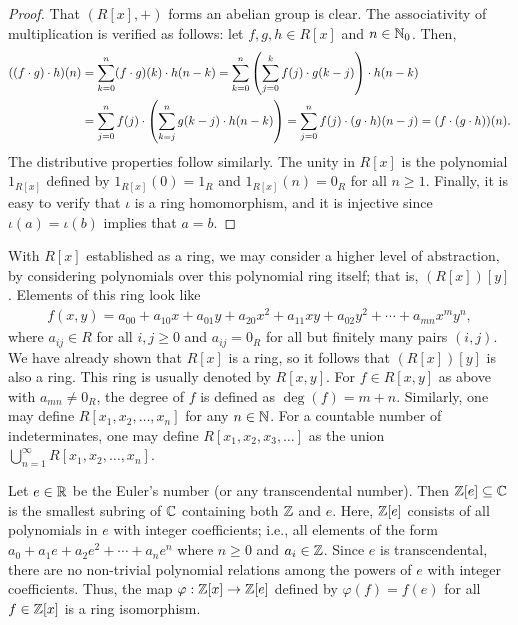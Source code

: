 \begin{proof}
    That $(R[x],+)$ forms an abelian group is clear. The associativity of multiplication is verified as follows: let $f, g, h \in R[x]$ and $n \in \mathbb{N}_{0}$. Then,
    \begin{align}
        ((f \cdot g) \cdot h)(n) &=  \sum_{k=0}^{n} (f \cdot g)(k) \cdot h(n-k) = \sum_{k=0}^{n} \left( \sum_{j=0}^{k} f(j) \cdot g(k-j) \right) \cdot h(n-k) \notag \\ &= \sum_{j=0}^{n} f(j) \cdot \left( \sum_{k=j}^{n} g(k-j) \cdot h(n-k) \right) = \sum_{j=0}^{n} f(j) \cdot (g \cdot h)(n-j) = (f \cdot (g \cdot h))(n).
    \end{align}
    The distributive properties follow similarly. The unity in $R[x]$ is the polynomial $1_{R[x]}$ defined by $1_{R[x]}(0) = 1_{R}$ and $1_{R[x]}(n) = 0_{R}$ for all $n \geq 1$. Finally, it is easy to verify that $\iota$ is a ring homomorphism, and it is injective since $\iota(a) = \iota(b)$ implies that $a = b$.
\end{proof}

With $R[x]$ established as a ring, we may consider a higher level of abstraction, by considering polynomials over this polynomial ring itself; that is, $(R[x])[y]$. Elements of this ring look like
\begin{align}
    f(x,y) = a_{00} + a_{10}x + a_{01}y + a_{20}x^{2} + a_{11}xy + a_{02}y^{2} + \cdots + a_{mn}x^{m}y^{n},
\end{align}
where $a_{ij} \in R$ for all $i, j \geq 0$ and $a_{ij} = 0_{R}$ for all but finitely many pairs $(i,j)$. We have already shown that $R[x]$ is a ring, so it follows that $(R[x])[y]$ is also a ring. This ring is usually denoted by $R[x,y]$. For $f \in R[x,y]$ as above with $a_{mn} \neq 0_{R}$, the degree of $f$ is defined as $\deg(f) = m + n$. Similarly, one may define $R[x_{1}, x_{2}, \ldots, x_{n}]$ for any $n \in \mathbb{N}$. For a countable number of indeterminates, one may define $R[x_{1}, x_{2}, x_{3}, \ldots]$ as the union $\bigcup_{n=1}^{\infty} R[x_{1}, x_{2}, \ldots, x_{n}]$.

\begin{example}
    Let $e \in \mathbb{R}$ be the Euler's number (or any transcendental number). Then $\mathbb{Z}[e] \subseteq \mathbb{C}$ is the smallest subring of $\mathbb{C}$ containing both $\mathbb{Z}$ and $e$. Here, $\mathbb{Z}[e]$ consists of all polynomials in $e$ with integer coefficients; i.e., all elements of the form $a_{0} + a_{1}e + a_{2}e^{2} + \cdots + a_{n}e^{n}$ where $n \geq 0$ and $a_{i} \in \mathbb{Z}$. Since $e$ is transcendental, there are no non-trivial polynomial relations among the powers of $e$ with integer coefficients. Thus, the map $\varphi : \mathbb{Z}[x] \to \mathbb{Z}[e]$ defined by $\varphi(f) = f(e)$ for all $f \in \mathbb{Z}[x]$ is a ring isomorphism.
\end{example}

